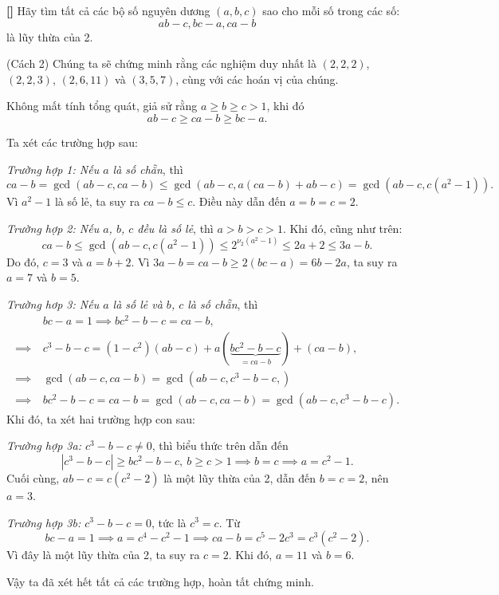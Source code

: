 \documentclass[../05-largest-exponent.tex]{subfiles}
\begin{document}
\begin{example*}\textbf{[]}
	Hãy tìm tất cả các bộ số nguyên dương $(a, b, c)$ sao cho mỗi số trong các số:
	\[
		ab - c, bc - a, ca - b
	\]
	là lũy thừa của 2.
\end{example*}

\begin{soln}\footnotemark(Cách 2)
	Chúng ta sẽ chứng minh rằng các nghiệm duy nhất là \( (2,2,2) \), \( (2,2,3) \), \( (2,6,11) \) và \( (3,5,7) \), cùng với các hoán vị của chúng.

	Không mất tính tổng quát, giả sử rằng \( a \geq b \geq c > 1 \), khi đó
	\[
		ab - c \geq ca - b \geq bc - a.
	\]

	Ta xét các trường hợp sau:

	\textit{Trường hợp 1: Nếu \( a \) là số chẵn}, thì
	\[
		ca-b = \gcd (ab-c, ca-b) \leq \gcd (ab-c, a(ca-b) + ab-c) = \gcd\left( ab-c, c(a^2-1) \right).
	\]
	Vì \( a^2 - 1 \) là số lẻ, ta suy ra \( ca - b \leq c \).
	Điều này dẫn đến \( a = b = c = 2 \).

	\textit{Trường hợp 2: Nếu \( a \), \( b \), \( c \) đều là số lẻ}, thì \( a > b > c > 1 \).
	Khi đó, cũng như trên:
	\[
		ca-b \leq \gcd (ab-c, c(a^2-1)) \leq 2^{\nu_2(a^2-1)} \leq 2a+2 \leq 3a-b.
	\]
	Do đó, \( c = 3 \) và \( a = b+2 \).
	Vì \( 3a - b = ca - b \geq 2(bc-a) = 6b - 2a \), ta suy ra \( a=7 \) và \( b=5 \).

	\textit{Trường hơp 3: Nếu \( a \) là số lẻ và \( b \), \( c \) là số chẵn}, thì
	\[
		\begin{aligned}
			&\ bc - a = 1 \implies bc^2 - b - c = ca - b,\\
			\implies&\ c^3 - b - c = (1 - c^2)(ab - c) + a(\underbrace{bc^2 - b - c}_{= ca-b}) + (ca - b),\\
			\implies&\ \gcd(ab - c, ca - b) = \gcd(ab - c, c^3 - b - c,)\\
			\implies&\ bc^2 - b - c = ca - b = \gcd(ab - c, ca - b) = \gcd(ab - c, c^3 - b - c).
		\end{aligned}
	\]
	Khi đó, ta xét hai trường hợp con sau:

	\textit{Trường hợp 3a: \( c^3 - b - c \neq 0 \)}, thì biểu thức trên dẫn đến 
	\[
		|c^3 - b - c| \geq bc^2 - b - c,\ b \geq c > 1 \implies b = c \implies a = c^2 - 1.
	\]
	Cuối cùng, \( ab - c = c(c^2 - 2) \) là một lũy thừa của 2, dẫn đến \( b = c = 2 \), nên \( a = 3 \).

	\textit{Trường hợp 3b: \( c^3 - b - c = 0 \)}, tức là \( c^3 = c \). Từ
	\[
		bc - a = 1 \implies a = c^4 - c^2 - 1 \implies ca - b = c^5 - 2c^3 = c^3(c^2 - 2).
	\]
	Vì đây là một lũy thừa của 2, ta suy ra \( c = 2 \).
	Khi đó, \( a = 11 \) và \( b = 6 \).

	Vậy ta đã xét hết tất cả các trường hợp, hoàn tất chứng minh.
\end{soln}

\end{document}
